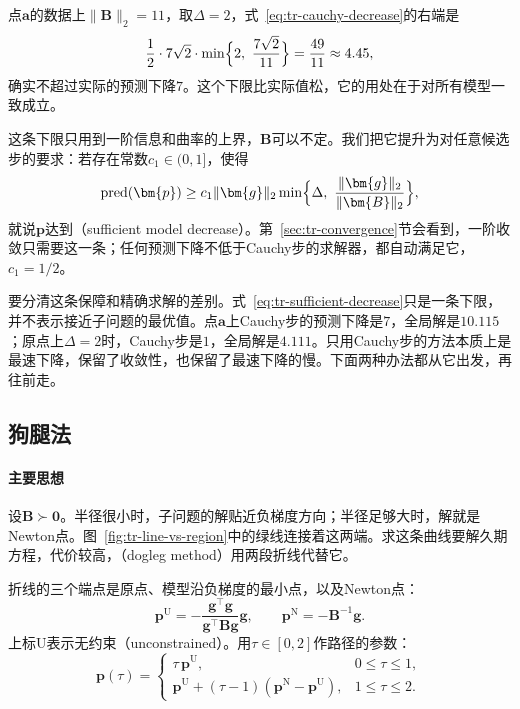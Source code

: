 点$\bm{a}$的数据上$\lVert\bm{B}\rVert_2=11$，取$\Delta=2$，式~\eqref{eq:tr-cauchy-decrease}的右端是
\[
 \frac12\cdot7\sqrt2\cdot\min\Bigl\{2,\ \frac{7\sqrt2}{11}\Bigr\}=\frac{49}{11}\approx4.45,
\]
确实不超过实际的预测下降$7$。这个下限比实际值松，它的用处在于对所有模型一致成立。

这条下限只用到一阶信息和曲率的上界，$\bm{B}$可以不定。我们把它提升为对任意候选步的要求：若存在常数$c_1\in(0,1]$，使得
\begin{equation}
 \operatorname{pred}(\bm{p})\geq c_1\lVert\bm{g}\rVert_2\min\Bigl\{\Delta,\ \frac{\lVert\bm{g}\rVert_2}{\lVert\bm{B}\rVert_2}\Bigr\},
 \label{eq:tr-sufficient-decrease}
\end{equation}
就说$\bm{p}$达到（sufficient model decrease）。第~\ref{sec:tr-convergence}节会看到，一阶收敛只需要这一条；任何预测下降不低于Cauchy步的求解器，都自动满足它，$c_1=1/2$。

要分清这条保障和精确求解的差别。式~\eqref{eq:tr-sufficient-decrease}只是一条下限，并不表示接近子问题的最优值。点$\bm{a}$上Cauchy步的预测下降是$7$，全局解是$10.115$；原点上$\Delta=2$时，Cauchy步是$1$，全局解是$4.111$。只用Cauchy步的方法本质上是最速下降，保留了收敛性，也保留了最速下降的慢。下面两种办法都从它出发，再往前走。

\subsection{狗腿法}
\label{sec:tr-dogleg}

\paragraph{主要思想}
设$\bm{B}\succ\bm{0}$。半径很小时，子问题的解贴近负梯度方向；半径足够大时，解就是Newton点。图~\ref{fig:tr-line-vs-region}中的绿线连接着这两端。求这条曲线要解久期方程，代价较高，（dogleg method）用两段折线代替它。

折线的三个端点是原点、模型沿负梯度的最小点，以及Newton点：
\begin{equation}
 \bm{p}^{\mathrm{U}}=-\frac{\bm{g}^\top\bm{g}}{\bm{g}^\top\bm{B}\bm{g}}\bm{g},\qquad
 \bm{p}^{\mathrm{N}}=-\bm{B}^{-1}\bm{g}.
 \label{eq:tr-dogleg-points}
\end{equation}
上标U表示无约束（unconstrained）。用$\tau\in[0,2]$作路径的参数：
\begin{equation}
 \bm{p}(\tau)=
 \begin{cases}
  \tau\,\bm{p}^{\mathrm{U}},&0\leq\tau\leq1,\\
  \bm{p}^{\mathrm{U}}+(\tau-1)(\bm{p}^{\mathrm{N}}-\bm{p}^{\mathrm{U}}),&1\leq\tau\leq2.
 \end{cases}
 \label{eq:tr-dogleg-path}
\end{equation}

